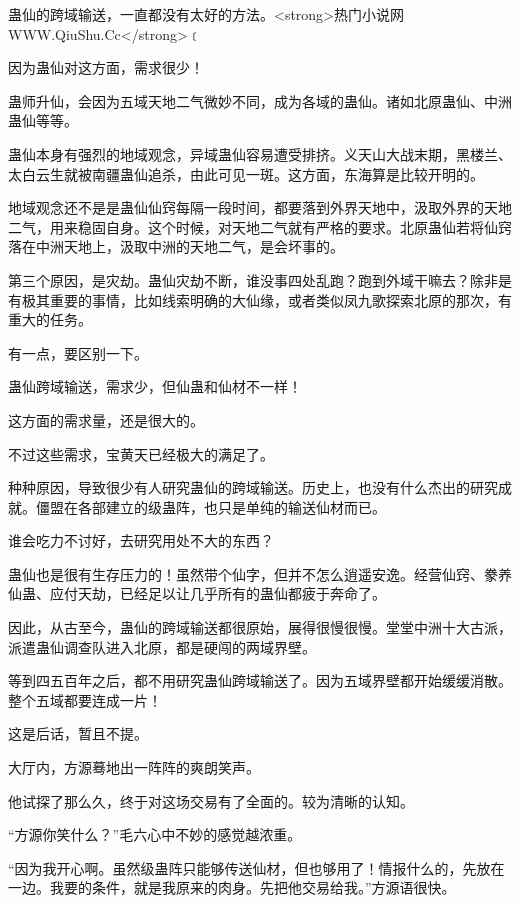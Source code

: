 
\begin{this_body}

蛊仙的跨域输送，一直都没有太好的方法。<strong>热门小说网WWW.QiuShu.Cc</strong>﹝

因为蛊仙对这方面，需求很少！

蛊师升仙，会因为五域天地二气微妙不同，成为各域的蛊仙。诸如北原蛊仙、中洲蛊仙等等。

蛊仙本身有强烈的地域观念，异域蛊仙容易遭受排挤。义天山大战末期，黑楼兰、太白云生就被南疆蛊仙追杀，由此可见一斑。这方面，东海算是比较开明的。

地域观念还不是是蛊仙仙窍每隔一段时间，都要落到外界天地中，汲取外界的天地二气，用来稳固自身。这个时候，对天地二气就有严格的要求。北原蛊仙若将仙窍落在中洲天地上，汲取中洲的天地二气，是会坏事的。

第三个原因，是灾劫。蛊仙灾劫不断，谁没事四处乱跑？跑到外域干嘛去？除非是有极其重要的事情，比如线索明确的大仙缘，或者类似凤九歌探索北原的那次，有重大的任务。

有一点，要区别一下。

蛊仙跨域输送，需求少，但仙蛊和仙材不一样！

这方面的需求量，还是很大的。

不过这些需求，宝黄天已经极大的满足了。

种种原因，导致很少有人研究蛊仙的跨域输送。历史上，也没有什么杰出的研究成就。僵盟在各部建立的级蛊阵，也只是单纯的输送仙材而已。

谁会吃力不讨好，去研究用处不大的东西？

蛊仙也是很有生存压力的！虽然带个仙字，但并不怎么逍遥安逸。经营仙窍、豢养仙蛊、应付天劫，已经足以让几乎所有的蛊仙都疲于奔命了。

因此，从古至今，蛊仙的跨域输送都很原始，展得很慢很慢。堂堂中洲十大古派，派遣蛊仙调查队进入北原，都是硬闯的两域界壁。

等到四五百年之后，都不用研究蛊仙跨域输送了。因为五域界壁都开始缓缓消散。整个五域都要连成一片！

这是后话，暂且不提。

大厅内，方源蓦地出一阵阵的爽朗笑声。

他试探了那么久，终于对这场交易有了全面的。较为清晰的认知。

“方源你笑什么？”毛六心中不妙的感觉越浓重。

“因为我开心啊。虽然级蛊阵只能够传送仙材，但也够用了！情报什么的，先放在一边。我要的条件，就是我原来的肉身。先把他交易给我。”方源语很快。


\end{this_body}
